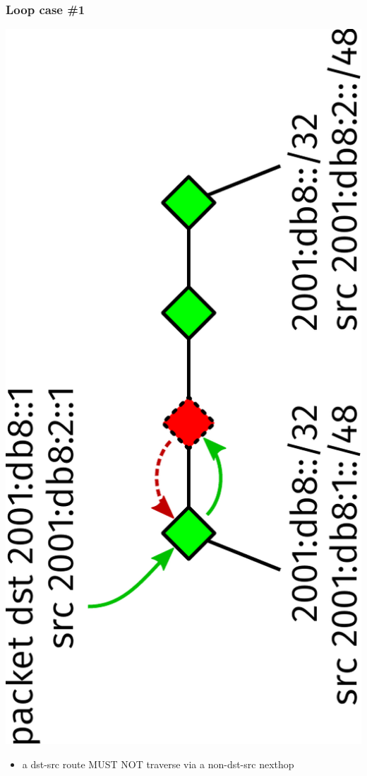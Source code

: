 \documentclass[12pt]{beamer}
\begin{document}
\begin{frame}
  \frametitle{Loop case \#1}
  \includegraphics[scale=0.45,angle=-90]{isis_loop1.pdf}%
  \vspace{10mm}
  \begin{itemize}
    \item a dst-src route MUST NOT traverse via a non-dst-src nexthop
  \end{itemize}
\end{frame}
\end{document}
